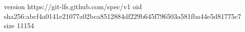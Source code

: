 version https://git-lfs.github.com/spec/v1
oid sha256:abcf4a0141e21077a02bca8512884df229b645f796503a581fba44e5d81775c7
size 11154
